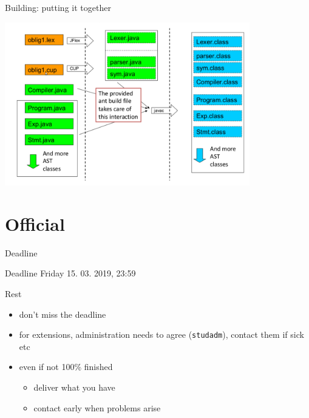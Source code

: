 \documentclass{beamer}
\begin{document}
\begin{frame}[label={sec:orgb346aba}]{Building: putting it together}

\begin{center}
 \includegraphics[width=0.8\textwidth]{figures/snaps/buildprocess}
\end{center}
\end{frame}

\section{Official}
\label{sec:orgfe2e551}

\begin{frame}[label={sec:org198cd31},fragile]{Deadline}
 \begin{alertblock}{Deadline}
\alert{Friday 15. 03. 2019, 23:59}
\end{alertblock}


\begin{block}{Rest}
\begin{itemize}
\item don't miss the deadline
\item for extensions, administration needs to agree (\texttt{studadm}), contact them
if sick etc
\item even if not 100\% finished
\begin{itemize}
\item deliver what you have
\item contact early when problems arise
\end{itemize}
\end{itemize}
\end{block}
\end{frame}
\end{document}
